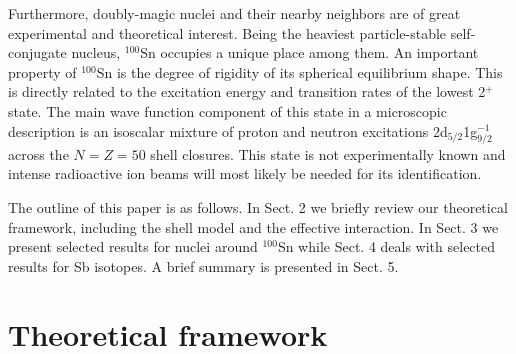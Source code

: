 Furthermore, 
doubly-magic nuclei and their nearby neighbors are of great experimental
and theoretical interest. Being the heaviest particle-stable
self-conjugate nucleus,
$^{100}$Sn occupies a unique place among them.
An important property of $^{100}$Sn is the degree of rigidity
of its spherical equilibrium shape. This is directly related to
the excitation energy and transition rates of the lowest 2$^+$
state. The main wave function component of this state in a
microscopic description is an isoscalar mixture of proton and
neutron excitations 2d$_{5/2}$1g$_{9/2}^{-1}$ across the $N=Z=50$
shell closures. This state is not experimentally known and
intense radioactive ion beams will most likely be needed for
its identification.

The outline of this paper is as follows. In Sect. 2 we briefly 
review our theoretical framework, including the shell model 
and the effective interaction. In Sect. 3 we present selected 
results for  nuclei around  $^{100}$Sn while Sect. 4 deals 
with selected results for Sb isotopes.
A brief summary is presented in Sect. 5.

\section{Theoretical framework}
